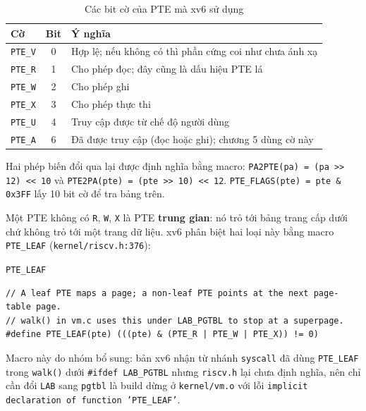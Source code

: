 \begin{table}[H]
    \centering
    \renewcommand{\arraystretch}{1.3}
    \setlength{\tabcolsep}{8pt}
    \begin{tabular}{|l|c|l|}
        \hline
        \rowcolor[rgb]{0.8, 0.9, 1.0}
        \textbf{Cờ} & \textbf{Bit} & \textbf{Ý nghĩa} \\ \hline
        \texttt{PTE\_V} & 0 & Hợp lệ; nếu không có thì phần cứng coi như chưa ánh xạ \\ \hline
        \texttt{PTE\_R} & 1 & Cho phép đọc; đây cũng là dấu hiệu PTE lá \\ \hline
        \texttt{PTE\_W} & 2 & Cho phép ghi \\ \hline
        \texttt{PTE\_X} & 3 & Cho phép thực thi \\ \hline
        \texttt{PTE\_U} & 4 & Truy cập được từ chế độ người dùng \\ \hline
        \texttt{PTE\_A} & 6 & Đã được truy cập (đọc hoặc ghi); chương 5 dùng cờ này \\ \hline
    \end{tabular}
    \caption{Các bit cờ của PTE mà xv6 sử dụng}
\end{table}

Hai phép biến đổi qua lại được định nghĩa bằng macro: \texttt{PA2PTE(pa) = (pa >> 12) << 10} và \texttt{PTE2PA(pte) = (pte >> 10) << 12}. \texttt{PTE\_FLAGS(pte) = pte \& 0x3FF} lấy 10 bit cờ để tra bảng trên.

Một PTE không có \texttt{R}, \texttt{W}, \texttt{X} là PTE \textbf{trung gian}: nó trỏ tới bảng trang cấp dưới chứ không trỏ tới một trang dữ liệu. xv6 phân biệt hai loại này bằng macro \texttt{PTE\_LEAF} (\texttt{kernel/riscv.h:376}):

\begin{codebox}[pteLeaf]{\texttt{PTE\_LEAF}}
    \begin{verbatim}
// A leaf PTE maps a page; a non-leaf PTE points at the next page-table page.
// walk() in vm.c uses this under LAB_PGTBL to stop at a superpage.
#define PTE_LEAF(pte) (((pte) & (PTE_R | PTE_W | PTE_X)) != 0)
    \end{verbatim}
\end{codebox}

Macro này do nhóm bổ sung: bản xv6 nhận từ nhánh \texttt{syscall} đã dùng \texttt{PTE\_LEAF} trong \texttt{walk()} dưới \texttt{\#ifdef LAB\_PGTBL} nhưng \texttt{riscv.h} lại chưa định nghĩa, nên chỉ cần đổi \texttt{LAB} sang \texttt{pgtbl} là build dừng ở \texttt{kernel/vm.o} với lỗi \texttt{implicit declaration of function 'PTE\_LEAF'}.

